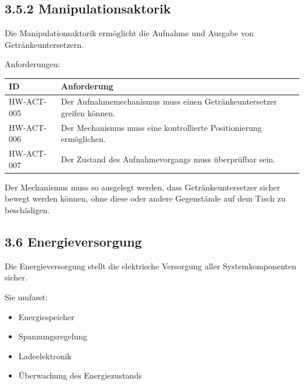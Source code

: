 \documentclass[
]{article}
\providecommand{\tightlist}{%
  \setlength{\itemsep}{0pt}\setlength{\parskip}{0pt}}
\begin{document}
\subsection{3.5.2 Manipulationsaktorik}\label{manipulationsaktorik}

Die Manipulationsaktorik ermöglicht die Aufnahme und Ausgabe von
Getränkeuntersetzern.

Anforderungen:

\begin{longtable}[]{@{}
  >{\raggedright\arraybackslash}p{}
  >{\raggedright\arraybackslash}p{}@{}}
\toprule\noalign{}
\begin{minipage}[b]{\linewidth}\raggedright
ID
\end{minipage} & \begin{minipage}[b]{\linewidth}\raggedright
Anforderung
\end{minipage} \\
\midrule\noalign{}
\endhead
\bottomrule\noalign{}
\endlastfoot
HW-ACT-005 & Der Aufnahmemechanismus muss einen Getränkeuntersetzer
greifen können. \\
HW-ACT-006 & Der Mechanismus muss eine kontrollierte Positionierung
ermöglichen. \\
HW-ACT-007 & Der Zustand des Aufnahmevorgangs muss überprüfbar sein. \\
\end{longtable}

Der Mechanismus muss so ausgelegt werden, dass Getränkeuntersetzer
sicher bewegt werden können, ohne diese oder andere Gegenstände auf dem
Tisch zu beschädigen.

\subsection{3.6 Energieversorgung}\label{energieversorgung}

Die Energieversorgung stellt die elektrische Versorgung aller
Systemkomponenten sicher.

Sie umfasst:

\begin{itemize}
\tightlist
\item
  Energiespeicher
\item
  Spannungsregelung
\item
  Ladeelektronik
\item
  Überwachung des Energiezustands
\end{itemize}
\end{document}

